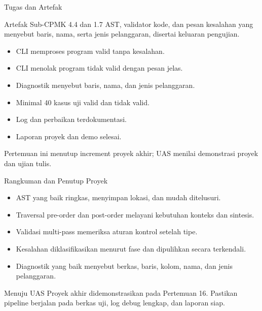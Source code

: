 \documentclass[aspectratio=169,10pt,t]{beamer}
\begin{document}
\begin{frame}{Tugas dan Artefak}
  \begin{block}{Artefak Sub-CPMK 4.4 dan 1.7}
    AST, validator kode, dan pesan kesalahan yang menyebut baris, nama,
    serta jenis pelanggaran, disertai keluaran pengujian.
  \end{block}

  \small
  \begin{itemize}
    \item CLI memproses program valid tanpa kesalahan.
    \item CLI menolak program tidak valid dengan pesan jelas.
    \item Diagnostik menyebut baris, nama, dan jenis pelanggaran.
    \item Minimal 40 kasus uji valid dan tidak valid.
    \item Log  dan perbaikan terdokumentasi.
    \item Laporan proyek dan demo selesai.
  \end{itemize}

  \vspace{3pt}
  {\footnotesize\color{ubbblue!75}Pertemuan ini menutup increment
  proyek akhir; UAS menilai demonstrasi proyek dan ujian tulis.}
\end{frame}

\begin{frame}{Rangkuman dan Penutup Proyek}
  \begin{itemize}
    \item AST yang baik ringkas, menyimpan lokasi, dan mudah
          ditelusuri.
    \item Traversal pre-order dan post-order melayani kebutuhan
          konteks dan sintesis.
    \item Validasi multi-pass memeriksa aturan kontrol setelah tipe.
    \item Kesalahan diklasifikasikan menurut fase dan dipulihkan
          secara terkendali.
    \item Diagnostik yang baik menyebut berkas, baris, kolom, nama,
          dan jenis pelanggaran.
  \end{itemize}

  \vspace{4pt}
  \begin{exampleblock}{Menuju UAS}
    Proyek akhir didemonstrasikan pada Pertemuan 16. Pastikan pipeline
    berjalan pada berkas uji, log debug lengkap, dan laporan siap.
  \end{exampleblock}
\end{frame}
\end{document}
